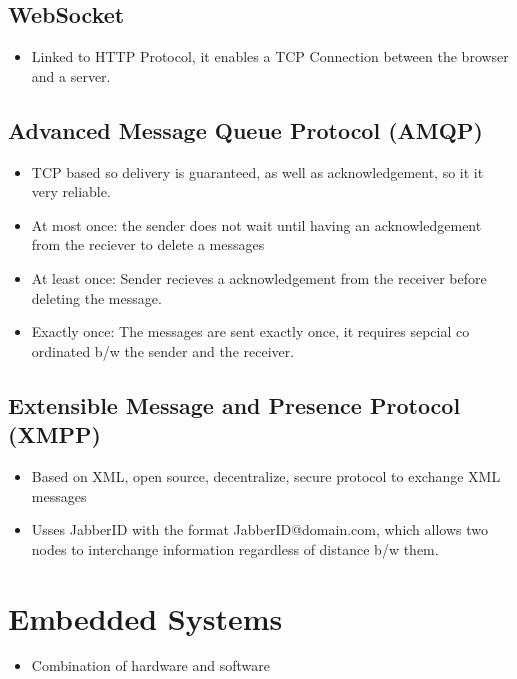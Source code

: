\documentclass[11pt]{article}
\begin{document}
\subsection{WebSocket}
\label{sec:orgcd44910}
\begin{itemize}
\item Linked to HTTP Protocol, it enables a TCP Connection between the browser and a server.
\end{itemize}

\subsection{Advanced Message Queue Protocol (AMQP)}
\label{sec:org3c9ef89}
\begin{itemize}
\item TCP based so delivery is guaranteed, as well as acknowledgement, so it it very reliable.
\item At most once: the sender does not wait until having an acknowledgement from the reciever to delete a messages
\item At least once: Sender recieves a acknowledgement from the receiver before deleting the message.
\item Exactly once: The messages are sent exactly once, it requires sepcial co ordinated b/w the sender and the receiver.
\end{itemize}

\subsection{Extensible Message and Presence Protocol (XMPP)}
\label{sec:org31d8600}
\begin{itemize}
\item Based on XML, open source, decentralize, secure protocol to exchange XML messages
\item Usses JabberID with the format JabberID@domain.com, which allows two nodes to interchange information regardless of distance b/w them.
\end{itemize}

\section{Embedded Systems}
\label{sec:org8dbf78e}
\begin{itemize}
\item Combination of hardware and software
\end{itemize}
\end{document}
